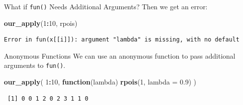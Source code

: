 \documentclass[
  ignorenonframetext,
  aspectratio=1610,
  onlytextwidth]{beamer}
\newenvironment{Shaded}{\begin{snugshade}}{\end{snugshade}}
\newcommand{\AttributeTok}[1]{\textcolor[rgb]{0.13,0.29,0.53}{#1}}
\newcommand{\ControlFlowTok}[1]{\textcolor[rgb]{0.13,0.29,0.53}{\textbf{#1}}}
\newcommand{\DecValTok}[1]{\textcolor[rgb]{0.00,0.00,0.81}{#1}}
\newcommand{\FloatTok}[1]{\textcolor[rgb]{0.00,0.00,0.81}{#1}}
\newcommand{\FunctionTok}[1]{\textcolor[rgb]{0.13,0.29,0.53}{\textbf{#1}}}
\newcommand{\NormalTok}[1]{#1}
\newcommand{\SpecialCharTok}[1]{\textcolor[rgb]{0.81,0.36,0.00}{\textbf{#1}}}
\begin{document}
\begin{frame}[fragile]{What if \texttt{fun()} Needs Additional
Arguments?}
\label{what-if-fun-needs-additional-arguments}
Then we get an error:

\begin{Shaded}
\begin{Highlighting}[]
\FunctionTok{our\_apply}\NormalTok{(}\DecValTok{1}\SpecialCharTok{:}\DecValTok{10}\NormalTok{, rpois)}
\end{Highlighting}
\end{Shaded}

\begin{verbatim}
Error in fun(x[[i]]): argument "lambda" is missing, with no default
\end{verbatim}

\pause

\begin{block}{Anonymous Functions}
\label{anonymous-functions}
We can use an anonymous function to pass additional arguments to
\texttt{fun()}.

\begin{Shaded}
\begin{Highlighting}[]
\FunctionTok{our\_apply}\NormalTok{(}
  \DecValTok{1}\SpecialCharTok{:}\DecValTok{10}\NormalTok{,}
  \ControlFlowTok{function}\NormalTok{(lambda) }\FunctionTok{rpois}\NormalTok{(}\DecValTok{1}\NormalTok{, }\AttributeTok{lambda =} \FloatTok{0.9}\NormalTok{)}
\NormalTok{)}
\end{Highlighting}
\end{Shaded}

\begin{verbatim}
 [1] 0 0 1 2 0 2 3 1 1 0
\end{verbatim}
\end{block}
\end{frame}
\end{document}
